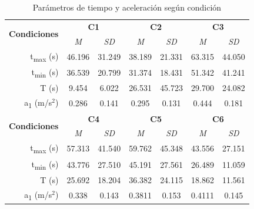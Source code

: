 \begin{table}[h]
\centering
\begin{tabular}{@{}rccccclc@{}}
\multirow{2}{*}{\textbf{Condiciones}} & \multicolumn{2}{c}{\textbf{C1}}          & \multicolumn{2}{c}{\textbf{C2}} & \multicolumn{3}{c}{\textbf{C3}}                  \\ \cmidrule(l){2-8} 
                                      & \textit{M}     & \textit{SD}    & \textit{M}     & \textit{SD}    & \multicolumn{2}{c}{\textit{M}} & \textit{SD}     \\ \midrule
t\textsubscript{max} (s)                              & 46.196         & 31.249         & 38.189         & 21.331         & \multicolumn{2}{c}{63.315}     & 44.050          \\ \midrule
t\textsubscript{min} (s)                              & 36.539         & 20.799         & 31.374         & 18.431         & \multicolumn{2}{c}{51.342}     & 41.241          \\ \midrule
T (s)                                 & 9.454          & 6.022          & 26.531         & 45.723         & \multicolumn{2}{c}{29.700}     & 24.082          \\ \midrule
a\textsubscript{1} (m/s$^2$)                             & 0.286          & 0.141          & 0.295          & 0.131          & \multicolumn{2}{c}{0.444}      & 0.181           \\ \midrule
\multirow{2}{*}{\textbf{Condiciones}} & \multicolumn{2}{c}{\textbf{C4}} & \multicolumn{2}{c}{\textbf{C5}} & \multicolumn{3}{c}{\textbf{C6}}                  \\ \cmidrule(l){2-8} 
                                      & \textit{M}     & \textit{SD}    & \textit{M}     & \textit{SD}    & \multicolumn{2}{c}{\textit{M}} & \textit{SD}     \\ \midrule
t\textsubscript{max} (s)                              & 57.313         & 41.540         & 59.762         & 45.348         & \multicolumn{2}{c}{43.556}     & 27.151          \\ \midrule
t\textsubscript{min} (s)                              & 43.776         & 27.510         & 45.191         & 27.561         & \multicolumn{2}{c}{26.489}     & 11.059          \\ \midrule
T (s)                                 & 25.692         & 18.204         & 36.382         & 24.115         & \multicolumn{2}{c}{18.862}     & 11.561          \\ \midrule
a\textsubscript{1} (m/s$^2$)                             & 0.338          & 0.143          & 0.3811         & 0.153          & \multicolumn{2}{c}{0.4111}     & 0.145           \\ \bottomrule
\end{tabular}
\caption{Parámetros de tiempo y aceleración según condición }
\label{tab:5.7}
\end{table}

